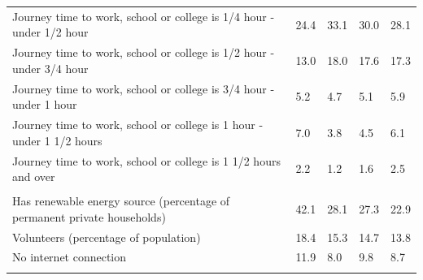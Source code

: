 \documentclass{article}
\begin{document}
\begin{table}[h]
\begin{tabular}{KTTTT}
Journey time to work, school or college is 1/4 hour - under 1/2 hour & 24.4& 33.1& 30.0& 28.1\\
Journey time to work, school or college is 1/2 hour - under 3/4 hour & 13.0& 18.0& 17.6& 17.3\\
Journey time to work, school or college is 3/4 hour - under 1 hour & 5.2& 4.7& 5.1& 5.9\\
Journey time to work, school or college is 1 hour - under 1 1/2 hours & 7.0& 3.8& 4.5& 6.1\\
Journey time to work, school or college is 1 1/2 hours and over & 2.2& 1.2& 1.6& 2.5\\
\hline
    \\ 
    \hline
Has renewable energy source (percentage of permanent private households) & 42.1& 28.1& 27.3& 22.9\\
    \hline
Volunteers (percentage of population) & 18.4& 15.3& 14.7& 13.8\\
    \hline
No internet connection& 11.9&  8.0&  9.8&  8.7\\
\hline
\end{tabular}
\end{table}
\end{document}

